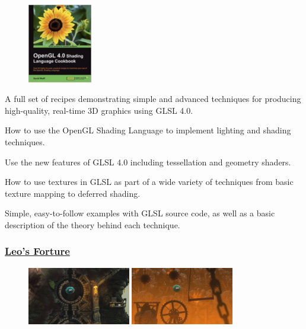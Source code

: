 \documentclass{scrartcl}
\numberwithin{figure}{subsection}
\begin{document}
\begin{figure}
  \includegraphics[width=0.25\textwidth, right]{glsl4book}
\end{figure}

A full set of recipes demonstrating simple and advanced techniques for producing high-quality, real-time 3D graphics using GLSL 4.0.

How to use the OpenGL Shading Language to implement lighting and shading techniques.

Use the new features of GLSL 4.0 including tessellation and geometry shaders.

How to use textures in GLSL as part of a wide variety of techniques from basic texture mapping to deferred shading.

Simple, easy-to-follow examples with GLSL source code, as well as a basic description of the theory behind each technique.

\subsubsection{\href{http://www.leosfortune.com/}{Leo's Forture}}

\begin{figure}
  \includegraphics[width=0.4\textwidth, right]{leosfortune}
  \includegraphics[width=0.4\textwidth, right]{leosfortune2}
\end{figure}
\end{document}
